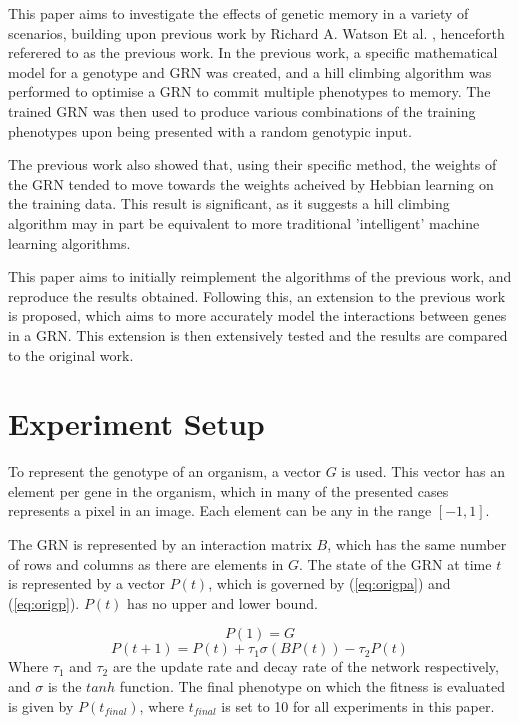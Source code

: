 \documentclass[twocolumn,a4paper,11pt]{article}
\begin{document}
    This paper aims to investigate the effects of genetic memory in a variety of scenarios, building upon previous work by Richard A. Watson Et al. \cite{original-paper}, henceforth referered to as the previous work. In the previous work, a specific mathematical model for a genotype and GRN was created, and a hill climbing algorithm was performed to optimise a GRN to commit multiple phenotypes to memory. The trained GRN was then used to produce various combinations of the training phenotypes upon being presented with a random genotypic input.

    The previous work also showed that, using their specific method, the weights of the GRN tended to move towards the weights acheived by Hebbian learning on the training data. This result is significant, as it suggests a hill climbing algorithm may in part be equivalent to more traditional 'intelligent' machine learning algorithms.

    This paper aims to initially reimplement the algorithms of the previous work, and reproduce the results obtained. Following this, an extension to the previous work is proposed, which aims to more accurately model the interactions between genes in a GRN. This extension is then extensively tested and the results are compared to the original work.

    \section{Experiment Setup}
    To represent the genotype of an organism, a vector $G$ is used. This vector has an element per gene in the organism, which in many of the presented cases represents a pixel in an image. Each element can be any in the range $[-1,1]$.

    The GRN is represented by an interaction matrix $B$, which has the same number of rows and columns as there are elements in $G$. The state of the GRN at time $t$ is represented by a vector $P(t)$, which is governed by (\ref{eq:origpa}) and (\ref{eq:origp}). $P(t)$ has no upper and lower bound.
    
    \begin{equation} \label{eq:origpa}
        P(1) = G
    \end{equation}
    \begin{equation} \label{eq:origp}
        P(t+1) = P(t) + \tau_1 \sigma (B P(t)) - \tau_2 P(t)
    \end{equation}
    Where $\tau_1$ and $\tau_2$ are the update rate and decay rate of the network respectively, and $\sigma$ is the $tanh$ function. The final phenotype on which the fitness is evaluated is given by $P(t_{final})$, where $t_{final}$ is set to 10 for all experiments in this paper.
\end{document}
